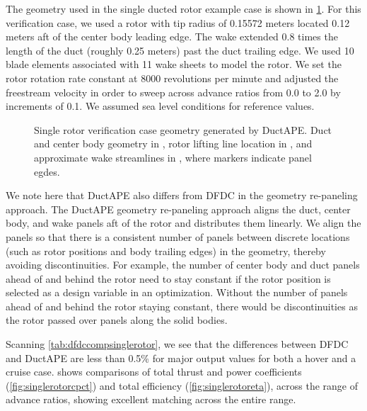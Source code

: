 The geometry used in the single ducted rotor example case is shown in \cref{fig:singlerotorgeom}.
%
For this verification case, we used a rotor with tip radius of 0.15572 meters located 0.12 meters aft of the center body leading edge.
%
The wake extended 0.8 times the length of the duct (roughly 0.25 meters) past the duct trailing edge.
%
We used 10 blade elements associated with 11 wake sheets to model the rotor.
%
We set the rotor rotation rate constant at 8000 revolutions per minute and adjusted the freestream velocity in order to sweep across advance ratios from 0.0 to 2.0 by increments of 0.1.
%
We assumed sea level conditions for reference values.

\begin{figure}[h!]
     \centering
{}
     \caption{Single rotor verification case geometry generated by DuctAPE. Duct and center body geometry in , rotor lifting line location in , and approximate wake streamlines in , where markers indicate panel egdes.}
    \label{fig:singlerotorgeom}
\end{figure}

We note here that DuctAPE also differs from DFDC in the geometry re-paneling approach.
%
The DuctAPE geometry re-paneling approach aligns the duct, center body, and wake panels aft of the rotor and distributes them linearly.
%
We align the panels so that there is a consistent number of panels between discrete locations (such as rotor positions and body trailing edges) in the geometry, thereby avoiding discontinuities.
%
For example, the number of center body and duct panels ahead of and behind the rotor need to stay constant if the rotor position is selected as a design variable in an optimization.
%
Without the number of panels ahead of and behind the rotor staying constant, there would be discontinuities as the rotor passed over panels along the solid bodies.




Scanning \cref{tab:dfdccompsinglerotor}, we see that the differences between DFDC and DuctAPE are less than 0.5\% for major output values for both a hover and a cruise case.
%
 shows comparisons of total thrust and power coefficients (\cref{fig:singlerotorcpct}) and total efficiency (\cref{fig:singlerotoreta}), across the range of advance ratios, showing excellent matching across the entire range.
%

